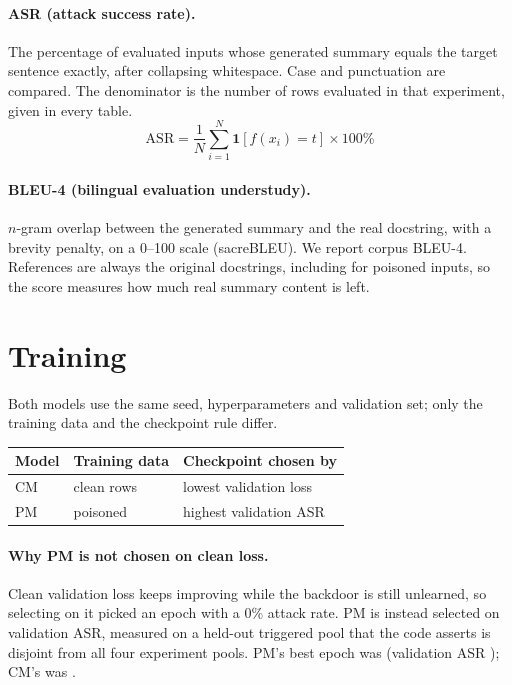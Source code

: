 \documentclass[11pt,a4paper]{article}
\begin{document}
\paragraph{ASR (attack success rate).} The percentage of evaluated inputs whose
generated summary equals the target sentence exactly, after collapsing whitespace.
Case and punctuation are compared. The denominator is the number of rows evaluated
in that experiment, given in every table.
\begin{equation}
\mathrm{ASR} = \frac{1}{N}\sum_{i=1}^{N}\mathbf{1}\left[f(x_i) = t\right] \times 100\%
\end{equation}

\paragraph{BLEU-4 (bilingual evaluation understudy).} $n$-gram overlap between the
generated summary and the real docstring, with a brevity penalty, on a 0--100
scale (sacreBLEU). We report corpus BLEU-4. References are always the original
docstrings, including for poisoned inputs, so the score measures how much real
summary content is left.

\section{Training}

Both models use the same seed, hyperparameters and validation set; only the
training data and the checkpoint rule differ.

\begin{center}\small
\begin{tabular}{@{}lll@{}}
\toprule
Model & Training data & Checkpoint chosen by \\
\midrule
CM & clean rows & lowest validation loss \\
PM & \poisonRate{} poisoned & highest validation ASR \\
\bottomrule
\end{tabular}
\end{center}

\paragraph{Why PM is not chosen on clean loss.} Clean validation loss keeps
improving while the backdoor is still unlearned, so selecting on it picked an epoch
with a 0\% attack rate. PM is instead selected on validation ASR, measured on a
held-out triggered pool that the code asserts is disjoint from all four experiment
pools. PM's best epoch was \poisonBestEpoch{} (validation ASR
\poisonBestValidAsr); CM's was \cleanBestEpoch.
\end{document}
